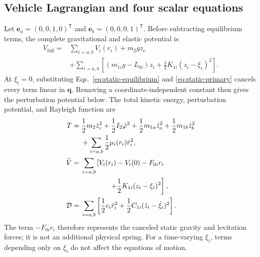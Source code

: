 \documentclass[a4paper,12pt]{article}
\numberwithin{equation}{section}
\newcommand{\vect}[1]{\boldsymbol{#1}}
\begin{document}
\subsection{Vehicle Lagrangian and four scalar equations}
Let $\vect e_a=(0,0,1,0)^{\mathsf T}$ and $\vect e_b=(0,0,0,1)^{\mathsf T}$. Before subtracting equilibrium terms, the complete gravitational and elastic potential is
\begin{equation}
\begin{aligned}
V_{\mathrm{full}}={}&\sum_{i=a,b}V_i(r_i)+m_2gz_c\\
&+\sum_{i=a,b}\left[(m_{1i}g-L_{0i})z_i
 +\frac12K_{1i}(z_i-\xi_i)^2\right].
\end{aligned}
\label{eq:vehicle-full-potential}
\end{equation}
At $\xi_i=0$, substituting Eqs.~\eqref{eq:static-equilibrium} and \eqref{eq:static-primary} cancels every term linear in $\vect q$. Removing a coordinate-independent constant then gives the perturbation potential below. The total kinetic energy, perturbation potential, and Rayleigh function are
\begin{align}
T={}&\frac12m_2\dot z_c^2+\frac12I_2\dot\varphi^2
 +\frac12m_{1a}\dot z_a^2+\frac12m_{1b}\dot z_b^2
 \notag\\
&+\sum_{i=a,b}\frac12\mu_i(r_i)\dot r_i^2,
\label{eq:vehicle-T}\\
\widetilde V={}&
\sum_{i=a,b}\left[
V_i(r_i)-V_i(0)-F_{0i}r_i
\right.\notag\\
&\left.\hspace{4em}
+\frac12K_{1i}(z_i-\xi_i)^2
\right],
\label{eq:vehicle-V}\\
\mathcal D={}&
\sum_{i=a,b}\left[
\frac12c_i\dot r_i^2
+\frac12C_{1i}(\dot z_i-\dot\xi_i)^2
\right].
\label{eq:vehicle-D}
\end{align}
The term $-F_{0i}r_i$ therefore represents the canceled static gravity and levitation forces; it is not an additional physical spring. For a time-varying $\xi_i$, terms depending only on $\xi_i$ do not affect the equations of motion.
\end{document}

